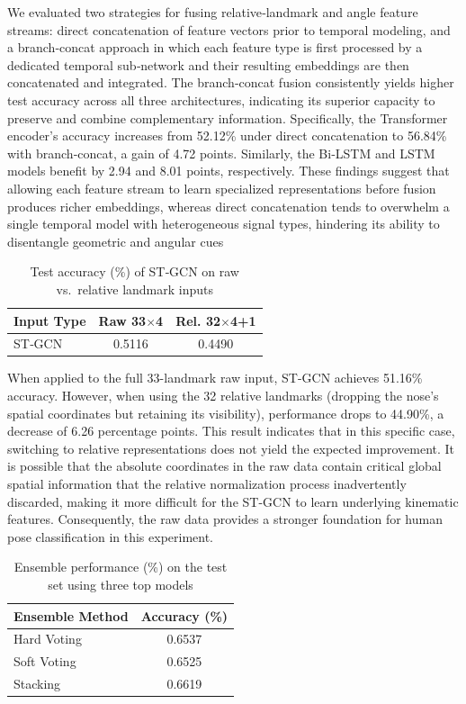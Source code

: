 \documentclass[journal,onecolumn, 11pt]{IEEEtran}
\begin{document}
We evaluated two strategies for fusing relative‐landmark and angle feature streams: direct concatenation of feature vectors prior to temporal modeling, and a branch‐concat approach in which each feature type is first processed by a dedicated temporal sub‐network and their resulting embeddings are then concatenated and integrated. The branch‐concat fusion consistently yields higher test accuracy across all three architectures, indicating its superior capacity to preserve and combine complementary information. Specifically, the Transformer encoder’s accuracy increases from 52.12\% under direct concatenation to 56.84\% with branch‐concat, a gain of 4.72 points. Similarly, the Bi‐LSTM and LSTM models benefit by 2.94 and 8.01 points, respectively. These findings suggest that allowing each feature stream to learn specialized representations before fusion produces richer embeddings, whereas direct concatenation tends to overwhelm a single temporal model with heterogeneous signal types, hindering its ability to disentangle geometric and angular cues

\begin{table}[H]
\centering
\caption{Test accuracy (\%) of ST‐GCN on raw vs.\ relative landmark inputs}
\label{tab:stgcn-results}
\begin{tabular}{l c c}
\hline
\textbf{Input Type} & \textbf{Raw 33$\times$4} & \textbf{Rel. 32$\times$4+1} \\
\hline
ST‐GCN              & 0.5116                   & 0.4490                     \\
\hline
\end{tabular}
\end{table}

When applied to the full 33-landmark raw input, ST-GCN achieves 51.16\% accuracy. However, when using the 32 relative landmarks (dropping the nose’s spatial coordinates but retaining its visibility), performance drops to 44.90\%, a decrease of 6.26 percentage points. This result indicates that in this specific case, switching to relative representations does not yield the expected improvement. It is possible that the absolute coordinates in the raw data contain critical global spatial information that the relative normalization process inadvertently discarded, making it more difficult for the ST-GCN to learn underlying kinematic features. Consequently, the raw data provides a stronger foundation for human pose classification in this experiment.


\begin{table}[H]
\centering
\caption{Ensemble performance (\%) on the test set using three top models}
\label{tab:ensemble-results}
\begin{tabular}{l c}
\hline
\textbf{Ensemble Method} & \textbf{Accuracy (\%)} \\
\hline
Hard Voting              & 0.6537                \\
Soft Voting              & 0.6525                \\
Stacking                 & 0.6619                \\
\hline
\end{tabular}
\end{table}
\end{document}
